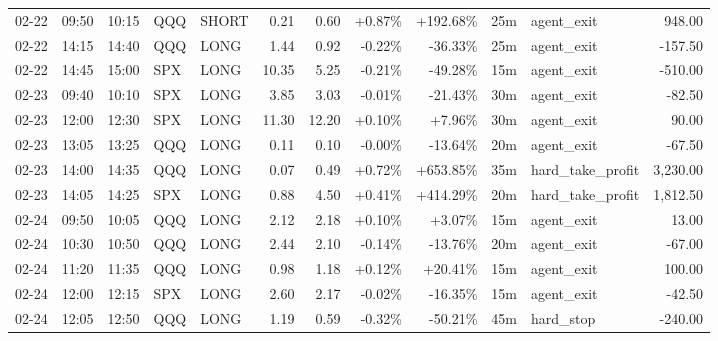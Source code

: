 \documentclass[11pt,a4paper]{article}
\begin{document}
\begin{center}
\begin{longtable}{>{\color{txtmain}}l l l l l r r r r r >{\color{txtmain}}l r}
02-22 & 09:50 & 10:15 & QQQ & SHORT & 0.21 & 0.60 & \textcolor{wingreen}{+0.87\%} & \textcolor{wingreen}{+192.68\%} & 25m & agent\_exit & \textcolor{wingreen}{948.00} \\
02-22 & 14:15 & 14:40 & QQQ & LONG & 1.44 & 0.92 & \textcolor{lossred}{-0.22\%} & \textcolor{lossred}{-36.33\%} & 25m & agent\_exit & \textcolor{lossred}{-157.50} \\
02-22 & 14:45 & 15:00 & SPX & LONG & 10.35 & 5.25 & \textcolor{lossred}{-0.21\%} & \textcolor{lossred}{-49.28\%} & 15m & agent\_exit & \textcolor{lossred}{-510.00} \\
02-23 & 09:40 & 10:10 & SPX & LONG & 3.85 & 3.03 & \textcolor{lossred}{-0.01\%} & \textcolor{lossred}{-21.43\%} & 30m & agent\_exit & \textcolor{lossred}{-82.50} \\
02-23 & 12:00 & 12:30 & SPX & LONG & 11.30 & 12.20 & \textcolor{wingreen}{+0.10\%} & \textcolor{wingreen}{+7.96\%} & 30m & agent\_exit & \textcolor{wingreen}{90.00} \\
02-23 & 13:05 & 13:25 & QQQ & LONG & 0.11 & 0.10 & \textcolor{lossred}{-0.00\%} & \textcolor{lossred}{-13.64\%} & 20m & agent\_exit & \textcolor{lossred}{-67.50} \\
02-23 & 14:00 & 14:35 & QQQ & LONG & 0.07 & 0.49 & \textcolor{wingreen}{+0.72\%} & \textcolor{wingreen}{+653.85\%} & 35m & hard\_take\_profit & \textcolor{wingreen}{3,230.00} \\
02-23 & 14:05 & 14:25 & SPX & LONG & 0.88 & 4.50 & \textcolor{wingreen}{+0.41\%} & \textcolor{wingreen}{+414.29\%} & 20m & hard\_take\_profit & \textcolor{wingreen}{1,812.50} \\
02-24 & 09:50 & 10:05 & QQQ & LONG & 2.12 & 2.18 & \textcolor{wingreen}{+0.10\%} & \textcolor{wingreen}{+3.07\%} & 15m & agent\_exit & \textcolor{wingreen}{13.00} \\
02-24 & 10:30 & 10:50 & QQQ & LONG & 2.44 & 2.10 & \textcolor{lossred}{-0.14\%} & \textcolor{lossred}{-13.76\%} & 20m & agent\_exit & \textcolor{lossred}{-67.00} \\
02-24 & 11:20 & 11:35 & QQQ & LONG & 0.98 & 1.18 & \textcolor{wingreen}{+0.12\%} & \textcolor{wingreen}{+20.41\%} & 15m & agent\_exit & \textcolor{wingreen}{100.00} \\
02-24 & 12:00 & 12:15 & SPX & LONG & 2.60 & 2.17 & \textcolor{lossred}{-0.02\%} & \textcolor{lossred}{-16.35\%} & 15m & agent\_exit & \textcolor{lossred}{-42.50} \\
02-24 & 12:05 & 12:50 & QQQ & LONG & 1.19 & 0.59 & \textcolor{lossred}{-0.32\%} & \textcolor{lossred}{-50.21\%} & 45m & hard\_stop & \textcolor{lossred}{-240.00} \\

\end{longtable}
\end{center}
\end{document}

